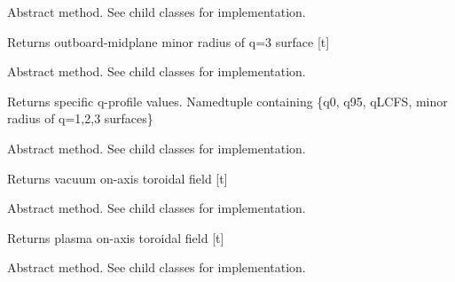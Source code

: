 \documentclass[letterpaper,10pt,english]{sphinxmanual}
\begin{document}
\begin{fulllineitems}

\begin{fulllineitems}
\label{eqtools:eqtools.core.Equilibrium.getQ3Surf}
Abstract method.  See child classes for implementation.

Returns outboard-midplane minor radius of q=3 surface {[}t{]}

\end{fulllineitems}


\begin{fulllineitems}
\label{eqtools:eqtools.core.Equilibrium.getQs}
Abstract method.  See child classes for implementation.

Returns specific q-profile values.
Namedtuple containing \{q0, q95, qLCFS, minor radius of q=1,2,3 surfaces\}

\end{fulllineitems}


\begin{fulllineitems}
\label{eqtools:eqtools.core.Equilibrium.getBtVac}
Abstract method.  See child classes for implementation.

Returns vacuum on-axis toroidal field {[}t{]}

\end{fulllineitems}


\begin{fulllineitems}
\label{eqtools:eqtools.core.Equilibrium.getBtPla}
Abstract method.  See child classes for implementation.

Returns plasma on-axis toroidal field {[}t{]}

\end{fulllineitems}


\begin{fulllineitems}
\label{eqtools:eqtools.core.Equilibrium.getBpAvg}
Abstract method.  See child classes for implementation.


\end{fulllineitems}
\end{fulllineitems}
\end{document}
